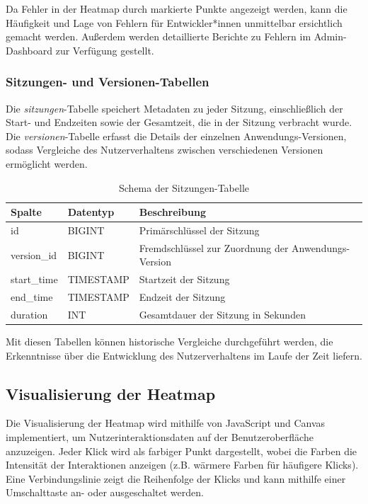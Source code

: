 \documentclass[12pt,oneside]{article}
\begin{document}
Da Fehler in der Heatmap durch markierte Punkte angezeigt werden, kann die Häufigkeit und Lage von Fehlern für Entwickler*innen unmittelbar ersichtlich gemacht werden. Außerdem werden detaillierte Berichte zu Fehlern im Admin-Dashboard zur Verfügung gestellt.

\subsubsection{Sitzungen- und Versionen-Tabellen}
Die \textit{sitzungen}-Tabelle speichert Metadaten zu jeder Sitzung, einschließlich der Start- und Endzeiten sowie der Gesamtzeit, die in der Sitzung verbracht wurde. Die \textit{versionen}-Tabelle erfasst die Details der einzelnen Anwendungs-Versionen, sodass Vergleiche des Nutzerverhaltens zwischen verschiedenen Versionen ermöglicht werden.

\begin{table}[H]
\centering
\caption{Schema der Sitzungen-Tabelle}
\begin{tabular}{|l|l|p{10cm}|}
\hline
\textbf{Spalte} & \textbf{Datentyp} & \textbf{Beschreibung} \\ \hline
id & BIGINT & Primärschlüssel der Sitzung \\ \hline
version\_id & BIGINT & Fremdschlüssel zur Zuordnung der Anwendungs-Version \\ \hline
start\_time & TIMESTAMP & Startzeit der Sitzung \\ \hline
end\_time & TIMESTAMP & Endzeit der Sitzung \\ \hline
duration & INT & Gesamtdauer der Sitzung in Sekunden \\ \hline
\end{tabular}
\end{table}

Mit diesen Tabellen können historische Vergleiche durchgeführt werden, die Erkenntnisse über die Entwicklung des Nutzerverhaltens im Laufe der Zeit liefern.

\subsection{Visualisierung der Heatmap}
Die Visualisierung der Heatmap wird mithilfe von JavaScript und Canvas implementiert, um Nutzerinteraktionsdaten auf der Benutzeroberfläche anzuzeigen. Jeder Klick wird als farbiger Punkt dargestellt, wobei die Farben die Intensität der Interaktionen anzeigen (z.B. wärmere Farben für häufigere Klicks). Eine Verbindungslinie zeigt die Reihenfolge der Klicks und kann mithilfe einer Umschalttaste an- oder ausgeschaltet werden.
\end{document}
